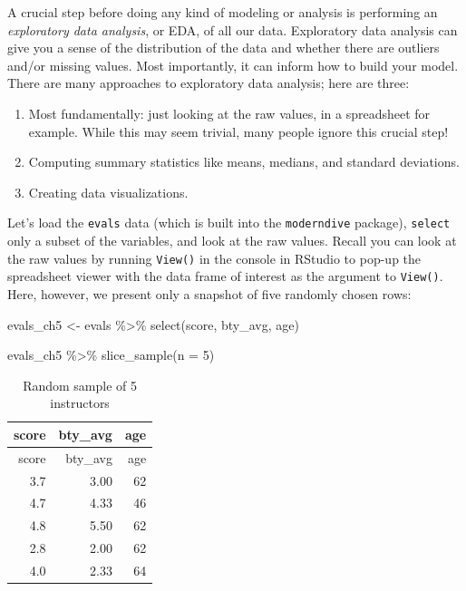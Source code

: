 \documentclass[
  letterpaper,
  DIV=11,
  numbers=noendperiod]{scrreprt}
\newenvironment{Shaded}{\begin{snugshade}}{\end{snugshade}}
\newcommand{\AttributeTok}[1]{\textcolor[rgb]{0.40,0.45,0.13}{#1}}
\newcommand{\DecValTok}[1]{\textcolor[rgb]{0.68,0.00,0.00}{#1}}
\newcommand{\FunctionTok}[1]{\textcolor[rgb]{0.28,0.35,0.67}{#1}}
\newcommand{\NormalTok}[1]{\textcolor[rgb]{0.00,0.23,0.31}{#1}}
\newcommand{\OtherTok}[1]{\textcolor[rgb]{0.00,0.23,0.31}{#1}}
\newcommand{\SpecialCharTok}[1]{\textcolor[rgb]{0.37,0.37,0.37}{#1}}
\theoremstyle{definition}
\theoremstyle{remark}
\begin{document}
A crucial step before doing any kind of modeling or analysis is
performing an \emph{exploratory data analysis}, or EDA, of all our data.
Exploratory data analysis can give you a sense of the distribution of
the data and whether there are outliers and/or missing values. Most
importantly, it can inform how to build your model. There are many
approaches to exploratory data analysis; here are three:

\begin{enumerate}
\def\labelenumi{\arabic{enumi}.}
\item
  Most fundamentally: just looking at the raw values, in a spreadsheet
  for example. While this may seem trivial, many people ignore this
  crucial step!
\item
  Computing summary statistics like means, medians, and standard
  deviations.
\item
  Creating data visualizations.
\end{enumerate}

Let's load the \texttt{evals} data (which is built into the
\texttt{moderndive} package), \texttt{select} only a subset of the
variables, and look at the raw values. Recall you can look at the raw
values by running \texttt{View()} in the console in RStudio to pop-up
the spreadsheet viewer with the data frame of interest as the argument
to \texttt{View()}. Here, however, we present only a snapshot of five
randomly chosen rows:

\begin{Shaded}
\begin{Highlighting}[]
\NormalTok{evals\_ch5 }\OtherTok{\textless{}{-}}\NormalTok{ evals }\SpecialCharTok{\%\textgreater{}\%}
  \FunctionTok{select}\NormalTok{(score, bty\_avg, age)}
\end{Highlighting}
\end{Shaded}

\begin{Shaded}
\begin{Highlighting}[]
\NormalTok{evals\_ch5 }\SpecialCharTok{\%\textgreater{}\%} 
  \FunctionTok{slice\_sample}\NormalTok{(}\AttributeTok{n =} \DecValTok{5}\NormalTok{)}
\end{Highlighting}
\end{Shaded}

\begin{longtable}[]{@{}rrr@{}}
\caption{Random sample of 5 instructors}\tabularnewline
\toprule()
score & bty\_avg & age \\
\midrule()
\endfirsthead
\toprule()
score & bty\_avg & age \\
\midrule()
\endhead
3.7 & 3.00 & 62 \\
4.7 & 4.33 & 46 \\
4.8 & 5.50 & 62 \\
2.8 & 2.00 & 62 \\
4.0 & 2.33 & 64 \\
\bottomrule()
\end{longtable}
\end{document}
